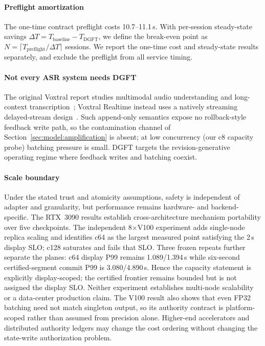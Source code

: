 \paragraph{Preflight amortization}
The one-time contract preflight costs 10.7--11.1\,s. With per-session
steady-state savings $\Delta T = T_{\mathrm{baseline}} - T_{\mathrm{DGFT}}$,
we define the break-even point as
$N = \lceil T_{\mathrm{preflight}} / \Delta T \rceil$ sessions. We report
the one-time cost and steady-state results separately, and exclude the
preflight from all service timing.

\paragraph{Not every ASR system needs DGFT}
The original Voxtral report studies multimodal audio understanding and
long-context transcription~\cite{mistral2025voxtral}; Voxtral Realtime instead
uses a natively streaming delayed-stream design~\cite{mistral2026voxtralrealtime}.
Such append-only semantics expose no rollback-style feedback write path, so
the contamination channel of
Section~\ref{sec:model:amplification} is absent; at low concurrency (our c8
capacity probe) batching pressure is small. DGFT targets the
revision-generative operating regime where feedback writes and batching
coexist.

\paragraph{Scale boundary}
Under the stated trust and atomicity assumptions, safety is independent of
adapter and granularity, but performance remains hardware- and
backend-specific. The RTX~3090 results establish cross-architecture mechanism
portability over five checkpoints. The independent 8$\times$V100 experiment
adds single-node replica scaling and identifies c64 as the largest measured
point satisfying the 2\,s display SLO; c128 saturates and fails that SLO.
Three frozen repeats further separate the planes: c64 display P99 remains
1.089/1.394\,s while six-second certified-segment commit P99 is
3.080/4.890\,s. Hence the capacity statement is explicitly display-scoped;
the certified frontier remains bounded but is not assigned the display SLO.
Neither experiment establishes multi-node scalability or a data-center
production claim. The V100 result also shows that even FP32 batching need not
match singleton output, so its authority contract is platform-scoped rather
than assumed from precision alone. Higher-end accelerators and distributed
authority ledgers may change the cost ordering without changing the
state-write authorization problem.

